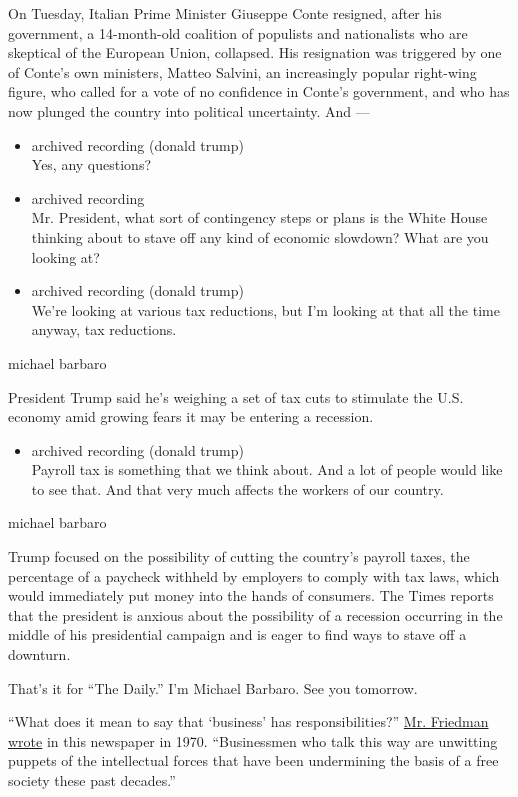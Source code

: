 On Tuesday, Italian Prime Minister Giuseppe Conte resigned, after his
government, a 14-month-old coalition of populists and nationalists who
are skeptical of the European Union, collapsed. His resignation was
triggered by one of Conte's own ministers, Matteo Salvini, an
increasingly popular right-wing figure, who called for a vote of no
confidence in Conte's government, and who has now plunged the country
into political uncertainty. And ---

\begin{itemize}
\item
  archived recording (donald trump)\\
  Yes, any questions?
\item
  archived recording\\
  Mr. President, what sort of contingency steps or plans is the White
  House thinking about to stave off any kind of economic slowdown? What
  are you looking at?
\item
  archived recording (donald trump)\\
  We're looking at various tax reductions, but I'm looking at that all
  the time anyway, tax reductions.
\end{itemize}

michael barbaro

President Trump said he's weighing a set of tax cuts to stimulate the
U.S. economy amid growing fears it may be entering a recession.

\begin{itemize}
\tightlist
\item
  archived recording (donald trump)\\
  Payroll tax is something that we think about. And a lot of people
  would like to see that. And that very much affects the workers of our
  country.
\end{itemize}

michael barbaro

Trump focused on the possibility of cutting the country's payroll taxes,
the percentage of a paycheck withheld by employers to comply with tax
laws, which would immediately put money into the hands of consumers. The
Times reports that the president is anxious about the possibility of a
recession occurring in the middle of his presidential campaign and is
eager to find ways to stave off a downturn.

That's it for ``The Daily.'' I'm Michael Barbaro. See you tomorrow.

``What does it mean to say that `business' has responsibilities?''
\href{https://timesmachine.nytimes3xbfgragh.onion/timesmachine/1970/09/13/223535702.html}{Mr.
Friedman wrote} in this newspaper in 1970. ``Businessmen who talk this
way are unwitting puppets of the intellectual forces that have been
undermining the basis of a free society these past decades.''

